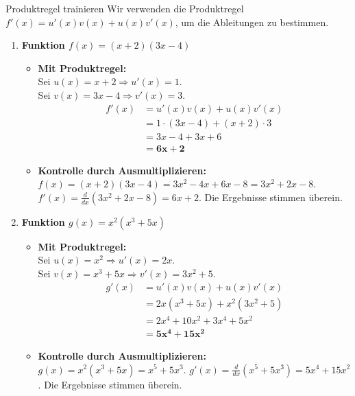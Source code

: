 \begin{loesungsumgebung}{Produktregel trainieren}
Wir verwenden die Produktregel $f'(x) = u'(x)v(x) + u(x)v'(x)$, um die Ableitungen zu bestimmen.

\begin{enumerate}[label=(\alph*)]
    \item \textbf{Funktion $f(x) = (x+2)(3x-4)$}
    \begin{itemize}
        \item \textbf{Mit Produktregel:} \\
        Sei $u(x) = x+2 \Rightarrow u'(x) = 1$. \\
        Sei $v(x) = 3x-4 \Rightarrow v'(x) = 3$.
        \begin{align*}
        f'(x) &= u'(x)v(x) + u(x)v'(x) \\
              &= 1 \cdot (3x-4) + (x+2) \cdot 3 \\
              &= 3x - 4 + 3x + 6 \\
              &= \mathbf{6x + 2}
        \end{align*}
        \item \textbf{Kontrolle durch Ausmultiplizieren:}
        $f(x) = (x+2)(3x-4) = 3x^2 - 4x + 6x - 8 = 3x^2 + 2x - 8$.
        $f'(x) = \frac{d}{dx}(3x^2 + 2x - 8) = 6x + 2$.
        Die Ergebnisse stimmen überein.
    \end{itemize}

    \item \textbf{Funktion $g(x) = x^2(x^3+5x)$}
    \begin{itemize}
        \item \textbf{Mit Produktregel:} \\
        Sei $u(x) = x^2 \Rightarrow u'(x) = 2x$. \\
        Sei $v(x) = x^3+5x \Rightarrow v'(x) = 3x^2+5$.
        \begin{align*}
        g'(x) &= u'(x)v(x) + u(x)v'(x) \\
              &= 2x(x^3+5x) + x^2(3x^2+5) \\
              &= 2x^4 + 10x^2 + 3x^4 + 5x^2 \\
              &= \mathbf{5x^4 + 15x^2}
        \end{align*}
        \item \textbf{Kontrolle durch Ausmultiplizieren:}
        $g(x) = x^2(x^3+5x) = x^5 + 5x^3$.
        $g'(x) = \frac{d}{dx}(x^5 + 5x^3) = 5x^4 + 15x^2$.
        Die Ergebnisse stimmen überein.
    \end{itemize}


\end{enumerate}
\end{loesungsumgebung}
